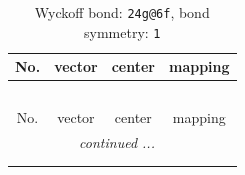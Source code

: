 \documentclass[fleqn,8pt]{jsarticle}
\begin{document}
\renewcommand{\arraystretch}{1.2}
\begin{longtable}{cccc}
\caption{Wyckoff bond: {\tt 24g@6f}, bond symmetry: {\tt 1}}
 \\
 \hline \hline
No. & vector & center & mapping \\ \hline \endfirsthead

\multicolumn{3}{l}{\tablename\ \thetable{}} \\
 \hline \hline
No. & vector & center & mapping \\ \hline \endhead

 \hline \hline
\multicolumn{3}{r}{\footnotesize\it continued ...} \\ \endfoot

 \hline \hline
\multicolumn{3}{r}{} \\ \endlastfoot


\end{longtable}
\end{document}
